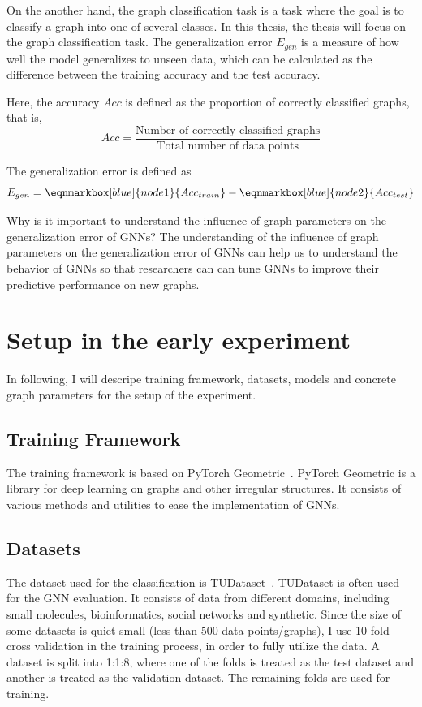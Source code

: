 \documentclass{article}
\begin{document}
On the another hand, the graph classification task is a task where the goal is to classify a graph into one of several classes. In this thesis, the thesis will focus on the graph classification task. The generalization error $E_{gen}$ is a measure of how well the model generalizes to unseen data, which can be calculated as the difference between the training accuracy and the test accuracy.

Here, the accuracy $Acc$ is defined as the proportion of correctly classified graphs, that is, 
$$Acc = \frac{\text{Number of correctly classified graphs}}{\text{Total number of data points}}$$

The generalization error is defined as
\\

\begin{equation*}
    E_{gen} = \eqnmarkbox[blue]{node1}{Acc_{train}} - \eqnmarkbox[blue]{node2}{Acc_{test}}
\end{equation*}

Why is it important to understand the influence of graph parameters on the generalization error of GNNs? The understanding of the influence of graph parameters on the generalization error of GNNs can help us to understand the behavior of GNNs so that researchers can can tune GNNs to improve their predictive performance on new graphs.
\section{Setup in the early experiment}
In following, I will descripe training framework, datasets, models and concrete graph parameters for the setup of the experiment.

\subsection{Training Framework}
The training framework is based on PyTorch Geometric~\cite{fey2019fast}. PyTorch Geometric is a library for deep learning on graphs and other irregular structures. It consists of various methods and utilities to ease the implementation of GNNs. 

\subsection{Datasets}
The dataset used for the classification is TUDataset~\cite{morris_tudataset_2020}. TUDataset is often used for the GNN evaluation. It consists of data from different domains, including small molecules, bioinformatics, social networks and synthetic. Since the size of some datasets is quiet small (less than 500 data points/graphs), I use 10-fold cross validation in the training process, in order to fully utilize the data. A dataset is split into 1:1:8, where one of the folds is treated as the test dataset and another is treated as the validation dataset. The remaining folds are used for training. 
\end{document}
